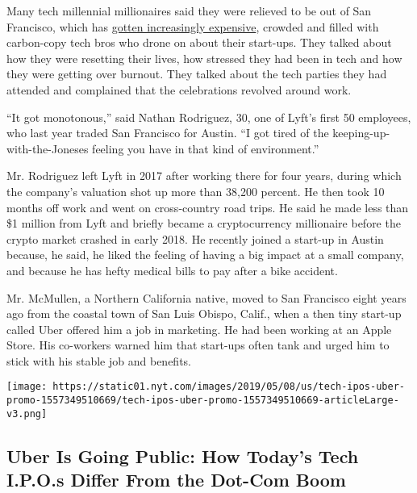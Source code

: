 Many tech millennial millionaires said they were relieved to be out of
San Francisco, which has
\href{https://www.nytimes.com/2019/03/07/style/uber-ipo-san-francisco-rich.html}{gotten
increasingly expensive}, crowded and filled with carbon-copy tech bros
who drone on about their start-ups. They talked about how they were
resetting their lives, how stressed they had been in tech and how they
were getting over burnout. They talked about the tech parties they had
attended and complained that the celebrations revolved around work.

``It got monotonous,'' said Nathan Rodriguez, 30, one of Lyft's first 50
employees, who last year traded San Francisco for Austin. ``I got tired
of the keeping-up-with-the-Joneses feeling you have in that kind of
environment.''

Mr. Rodriguez left Lyft in 2017 after working there for four years,
during which the company's valuation shot up more than 38,200 percent.
He then took 10 months off work and went on cross-country road trips. He
said he made less than \$1 million from Lyft and briefly became a
cryptocurrency millionaire before the crypto market crashed in early
2018. He recently joined a start-up in Austin because, he said, he liked
the feeling of having a big impact at a small company, and because he
has hefty medical bills to pay after a bike accident.

Mr. McMullen, a Northern California native, moved to San Francisco eight
years ago from the coastal town of San Luis Obispo, Calif., when a then
tiny start-up called Uber offered him a job in marketing. He had been
working at an Apple Store. His co-workers warned him that start-ups
often tank and urged him to stick with his stable job and benefits.

\href{https://www.nytimes.com/interactive/2019/05/09/business/dealbook/tech-ipos-uber.html}{}

\texttt{[image: https://static01.nyt.com/images/2019/05/08/us/tech-ipos-uber-promo-1557349510669/tech-ipos-uber-promo-1557349510669-articleLarge-v3.png]}

\hypertarget{uber-is-going-public-how-todays-tech-ipos-differ-from-the-dot-com-boom}{%
\subsection{Uber Is Going Public: How Today's Tech I.P.O.s Differ From
the Dot-Com
Boom}\label{uber-is-going-public-how-todays-tech-ipos-differ-from-the-dot-com-boom}}

